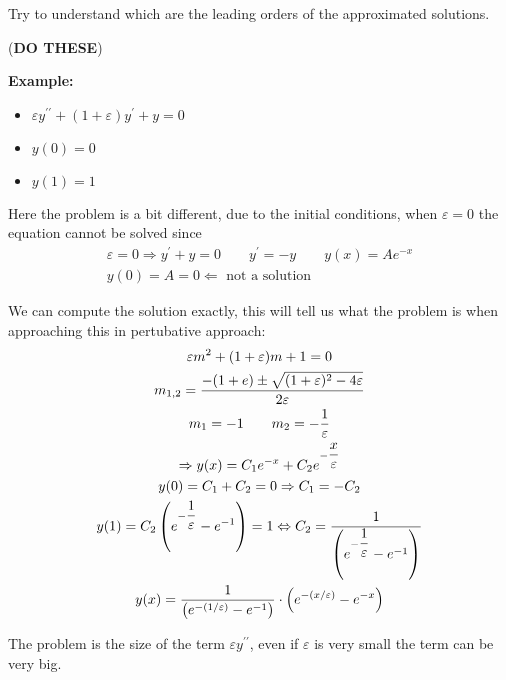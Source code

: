 \noindent Try to understand which are the leading orders of the approximated solutions.\par
\noindent (\textbf{DO THESE})
\par\bigskip
\noindent\textbf{Example:}\par
\begin{itemize}
  \item $\varepsilon y^{\prime\prime}+(1+\varepsilon)y^{\prime}+y=0$
  \item $y(0) = 0$
  \item $y(1) = 1$
\end{itemize}
\par\bigskip
\noindent Here the problem is a bit different, due to the initial conditions, when $\varepsilon=0$ the equation cannot be solved since
\begin{equation*}
  \begin{gathered}
    \varepsilon=0\Rightarrow y^{\prime}+y=0\qquad y^{\prime} = -y\qquad y(x) = Ae^{-x}\\
    y(0) = A = 0 \Leftarrow \text{ not a solution}
  \end{gathered}
\end{equation*}
\par\bigskip
\noindent We can compute the solution exactly, this will tell us what the problem is when approaching this in pertubative approach:
\begin{equation*}
  \begin{gathered}
    \varepsilon m^2+(1+\varepsilon)m+1=0\\
    m_{1,2} = \dfrac{-(1+e)\pm\sqrt{(1+\varepsilon)^2-4\varepsilon}}{2\varepsilon}\\
    m_1 = -1\qquad m_2 = -\dfrac{1}{\varepsilon}\\
    \Rightarrow y(x) = C_1e^{-x}+C_2e^{-\dfrac{x}{\varepsilon}}\\
    y(0) = C_1+C_2 = 0\Rightarrow C_1 = -C_2\\
    y(1) = C_2\left(e^{-\dfrac{1}{\varepsilon}}-e^{-1}\right) = 1\Leftrightarrow C_2 = \dfrac{1}{\left(e^{-\dfrac{1}{\varepsilon}}-e^{-1}\right)}\\
    y(x) = \dfrac{1}{\left(e^{-(1/\varepsilon)}-e^{-1}\right)}\cdot\left(e^{-(x/\varepsilon)}-e^{-x}\right)
  \end{gathered}
\end{equation*}
\par\bigskip
\noindent The problem is the size of the term $\varepsilon y^{\prime\prime}$, even if $\varepsilon$ is very small the term can be very big.

